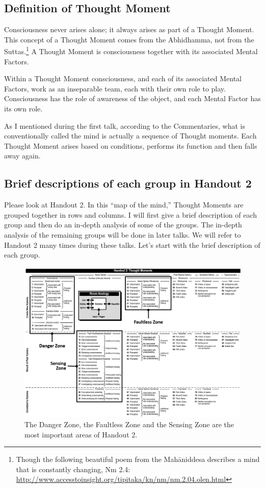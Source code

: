 \subsection*{Definition of Thought Moment}

Consciousness never arises alone; it always arises as part of a Thought Moment. This concept of a Thought Moment comes from the Abhidhamma, not from the Suttas.\footnote{Though the following beautiful poem from the Mahāniddesa describes a mind that is constantly changing, Nm 2.4: \url{http://www.accesstoinsight.org/tipitaka/kn/nm/nm.2.04.olen.html}} A Thought Moment is consciousness together with its associated Mental Factors.

Within a Thought Moment consciousness, and each of its associated Mental Factors, work as an inseparable team, each with their own role to play. Consciousness has the role of awareness of the object, and each Mental Factor has its own role.

As I mentioned during the first talk, according to the Commentaries, what is conventionally called the mind is actually a sequence of Thought moments. Each Thought Moment arises based on conditions, performs its function and then falls away again.

\pagebreak

\subsection*{Brief descriptions of each group in Handout 2}

Please look at Handout 2. In this “map of the mind,” Thought Moments are grouped together in rows and columns. I will first give a brief description of each group and then do an in-depth analysis of some of the groups. The in-depth analysis of the remaining groups will be done in later talks. We will refer to Handout 2 many times during these talks. Let’s start with the brief description of each group.

\begin{figure}[h]
\centering
\includegraphics[width=1\linewidth]{./Diagrams/Handout_2}
\caption{The Danger Zone, the Faultless Zone and the Sensing Zone are the most important areas of Handout 2.}
\label{fig:Handout_2}
\end{figure}

